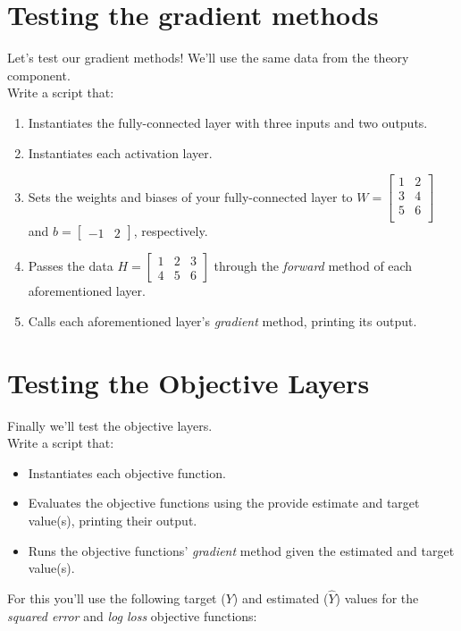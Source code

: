 \documentclass[12pt]{article}
\begin{document}
\newpage
\section{Testing the gradient methods}
Let's test our gradient methods!  We'll use the same data from the theory component.\\

\noindent
Write a script that:
\begin{enumerate}
\item Instantiates the fully-connected layer with three inputs and two outputs.
\item Instantiates each activation layer.
\item Sets the weights and biases of your fully-connected layer to $W=\begin{bmatrix}
1 & 2\\
3 & 4\\
5 & 6\\
\end{bmatrix}$ and $b=\begin{bmatrix}-1 & 2\end{bmatrix}$, respectively.
\item Passes the data $H=\begin{bmatrix}1 & 2 & 3\\ 4 & 5 & 6 \end{bmatrix}$ through the \emph{forward} method of each aforementioned layer.
\item Calls each aforementioned layer's \emph{gradient} method, printing its output.
\end{enumerate}


\newpage
\section{Testing the Objective Layers}
Finally we'll test the objective layers.\\

\noindent
Write a script that:
\begin{itemize}
\item Instantiates each objective function.
\item Evaluates the objective functions using the provide estimate and target value(s), printing their output.
\item Runs the objective functions' \emph{gradient} method given the estimated and target value(s).
\end{itemize}

\noindent
For this you'll use the following target ($Y$) and estimated ($\hat{Y}$) values for the \emph{squared error} and \emph{log loss} objective functions:
\end{document}

